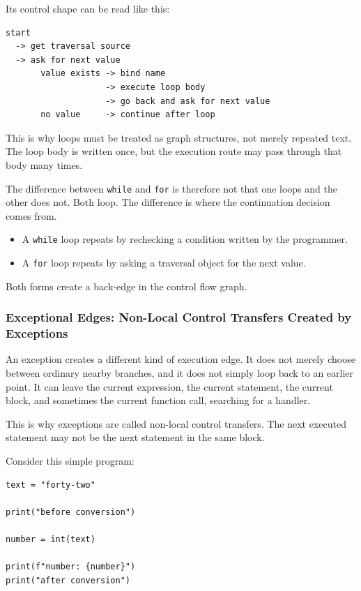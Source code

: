 \documentclass[a4paper,twoside]{report}
\begin{document}
Its control shape can be read like this:

\begin{verbatim}
start
  -> get traversal source
  -> ask for next value
       value exists -> bind name
                    -> execute loop body
                    -> go back and ask for next value
       no value     -> continue after loop
\end{verbatim}

This is why loops must be treated as graph structures, not merely repeated text. The loop body is written once, but the execution route may pass through that body many times.

The difference between \texttt{while} and \texttt{for} is therefore not that one loops and the other does not. Both loop. The difference is where the continuation decision comes from.

\begin{itemize}
    \item A \texttt{while} loop repeats by rechecking a condition written by the programmer.
    \item A \texttt{for} loop repeats by asking a traversal object for the next value.
\end{itemize}

Both forms create a back-edge in the control flow graph.

\subsubsection{Exceptional Edges: Non-Local Control Transfers Created by Exceptions}

An exception creates a different kind of execution edge. It does not merely choose between ordinary nearby branches, and it does not simply loop back to an earlier point. It can leave the current expression, the current statement, the current block, and sometimes the current function call, searching for a handler.

This is why exceptions are called non-local control transfers. The next executed statement may not be the next statement in the same block.

Consider this simple program:

\begin{verbatim}
text = "forty-two"

print("before conversion")

number = int(text)

print(f"number: {number}")
print("after conversion")
\end{verbatim}
\end{document}
